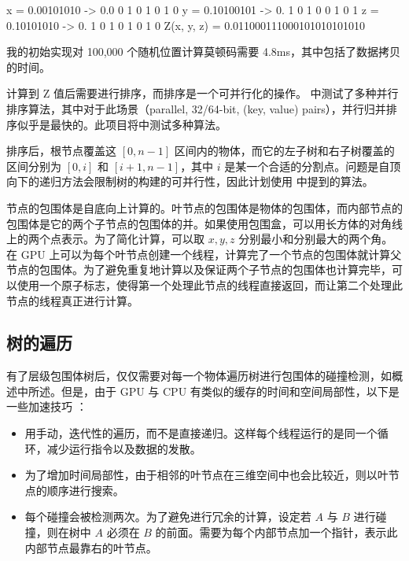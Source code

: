 \begin{codeblock}
                        x = 0.00101010 -> 0.0  0  1  0  1  0  1  0
                        y = 0.10100101 -> 0. 1  0  1  0  0  1  0  1
                        z = 0.10101010 -> 0.  1  0  1  0  1  0  1  0
                             Z(x, y, z) = 0.011000111000101010101010
\end{codeblock}

我的初始实现对 100,000 个随机位置计算莫顿码需要 4.8ms，其中包括了数据拷贝的时间。


计算到 Z 值后需要进行排序，而排序是一个可并行化的操作。\cite{sorting} 中测试了多种并行排序算法，其中对于此场景（parallel, 32/64-bit, (key, value) pairs），并行归并排序似乎是最快的。此项目将中测试多种算法。

排序后，根节点覆盖这 $[0, n-1]$ 区间内的物体，而它的左子树和右子树覆盖的区间分别为 $[0, i]$ 和 $[i+1,n-1]$，其中 $i$ 是某一个合适的分割点。问题是自顶向下的递归方法会限制树的构建的可并行性，因此计划使用 \cite{Karras2012} 中提到的算法。

节点的包围体是自底向上计算的。叶节点的包围体是物体的包围体，而内部节点的包围体是它的两个子节点的包围体的并。如果使用包围盒，可以用长方体的对角线上的两个点表示。为了简化计算，可以取 $x,y,z$ 分别最小和分别最大的两个角。在 GPU 上可以为每个叶节点创建一个线程，计算完了一个节点的包围体就计算父节点的包围体。为了避免重复地计算以及保证两个子节点的包围体也计算完毕，可以使用一个原子标志，使得第一个处理此节点的线程直接返回，而让第二个处理此节点的线程真正进行计算。

\subsection{树的遍历}

有了层级包围体树后，仅仅需要对每一个物体遍历树进行包围体的碰撞检测，如概述中所述。但是，由于 GPU 与 CPU 有类似的缓存的时间和空间局部性，以下是一些加速技巧 \cite{nvidiaTreeTraversal}：

\begin{itemize}
    \item 用手动，迭代性的遍历，而不是直接递归。这样每个线程运行的是同一个循环，减少运行指令以及数据的发散。
    \item 为了增加时间局部性，由于相邻的叶节点在三维空间中也会比较近，则以叶节点的顺序进行搜索。
    \item 每个碰撞会被检测两次。为了避免进行冗余的计算，设定若 $A$ 与 $B$ 进行碰撞，则在树中 $A$ 必须在 $B$ 的前面。需要为每个内部节点加一个指针，表示此内部节点最靠右的叶节点。
\end{itemize}

